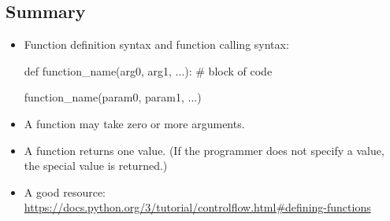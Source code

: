 \documentclass[11pt]{cselabheader}
\begin{document}
\subsection{Summary}
\label{subsec:funcs.sum}

\begin{itemize}
  \item Function definition syntax and function calling syntax:

    \begin{multicols}{2}
    \begin{python3code}
def function_name(arg0, arg1, ...):
    # block of code
    \end{python3code}

    \begin{python3code}
function_name(param0, param1, ...)
    \end{python3code}
    \end{multicols}

  \item A function may take zero or more arguments.

  \item A function returns one value. (If the programmer does not specify a
    value, the special value  is returned.)

  \item A good resource: \url{https://docs.python.org/3/tutorial/controlflow.html#defining-functions}
\end{itemize}

\pagebreak
%
\end{document}
